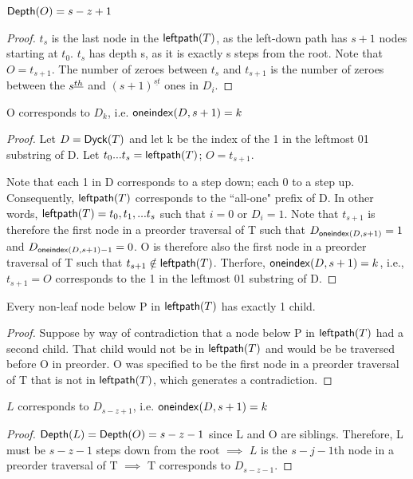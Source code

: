 \begin{remark} $\mathsf{Depth}{(O)}=s-z+1$ \label{re:o_depth_formula}
\end{remark} 
\begin{proof}


    $t_s$ is the last node in the $\mathsf{leftpath}{(T)}$, as the left-down path has $s+1$ nodes starting at $t_0$. $t_s$ has depth s, as it is exactly s steps from the root.  Note that $O=t_{s+1}$.  The number of zeroes between $t_s$ and $t_{s+1}$ is the number of zeroes between the $s^{\underline{th}}$ and $(s+1)^{\underline{st}}$ ones in $D_i$.  

\end{proof} 
\begin{remark}O corresponds to $D_k$, i.e. $\mathsf{oneindex}({D}, s+1)=k$
\end{remark}
\begin{proof}
    Let $D=\mathsf{Dyck}{(T)}$ and let k be the index of the 1 in the leftmost 01 substring of D.  Let $t_0...t_s=\mathsf{leftpath}{(T)}$; $O=t_{s+1}$.


    Note that each 1 in D corresponds to a step down; each 0 to a step up.  Consequently, $\mathsf{leftpath}{(T)}$ corresponds to the ``all-one" prefix of D.  In other words, $\mathsf{leftpath}{(T)}=t_0,t_1,...t_{s}$ such that $i=0$ or $D_i=1$. Note that $t_{s+1}$ is therefore the first node in a preorder traversal of T such that $D_{\mathsf{oneindex}({D}, s+1)}=1$ and $D_{\mathsf{oneindex}({D}, s+1)-1}=0$.  O is therefore also the first node in a preorder traversal of T such that $t_{s+1} \notin \mathsf{leftpath}{(T)}$.  Therfore, $\mathsf{oneindex}({D}, s+1)=k$, i.e., $t_{s+1}=O$ corresponds to the 1 in the leftmost 01 substring of D.

\end{proof}
\begin{remark} Every non-leaf node below P in $\mathsf{leftpath}{(T)}$ has exactly 1 child.  
\end{remark}

\begin{proof}
    Suppose by way of contradiction that a node below P in $\mathsf{leftpath}{(T)}$ had a second child. That child would not be in $\mathsf{leftpath}{(T)}$ and would be be traversed before O in preorder. O was specified to be the first node in a preorder traversal of T that is not in $\mathsf{leftpath}{(T)}$, which generates a contradiction.

\end{proof}

\begin{remark} \label{re:L_sz1}
    $L$ corresponds to $D_{s-z+1}$, i.e. $\mathsf{oneindex}({D}, s+1)=k$
\end{remark}
\begin{proof}

    $\mathsf{Depth}{(L)}=\mathsf{Depth}{(O)}=s-z-1$ since L and O are siblings. Therefore, L must be $s-z-1$ steps down from the root $\implies$ $L$ is the $s-j-1$th node in a preorder traversal of T $\implies$ T corresponds to $D_{s-z-1}$.


\end{proof}

